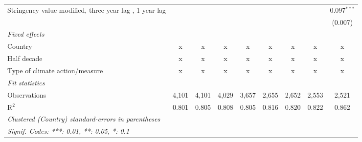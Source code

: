 \begin{table}[htbp]
\begin{tabular}{lcccccccc}
      Stringency value modified, three-year lag , 1-year lag                            &               &               &               &              &               &               &               & 0.097$^{***}$\\   
                                                                                        &               &               &               &              &               &               &               & (0.007)\\   
      \emph{Fixed effects}\\
      Country                                                                           & x             & x             & x             & x            & x             & x             & x             & x\\  
      Half decade                                                                       & x             & x             & x             & x            & x             & x             & x             & x\\  
      Type of climate action/measure                                                    & x             & x             & x             & x            & x             & x             & x             & x\\  
      \midrule \emph{Fit statistics}\\
      Observations                                                                      & 4,101         & 4,101         & 4,029         & 3,657        & 2,655         & 2,652         & 2,553         & 2,521\\  
      R$^2$                                                                             & 0.801         & 0.805         & 0.808         & 0.805        & 0.816         & 0.820         & 0.822         & 0.862\\  
      \midrule
      \multicolumn{9}{l}{\emph{Clustered (Country) standard-errors in parentheses}}\\
      \multicolumn{9}{l}{\emph{Signif. Codes: ***: 0.01, **: 0.05, *: 0.1}}\\
   \end{tabular}
\end{table}


